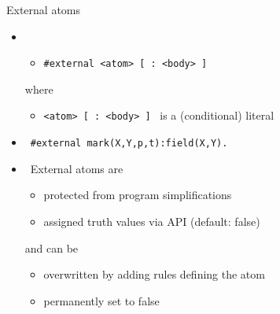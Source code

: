 \begin{frame}{External atoms}
  \begin{itemize}
  \item {}
    \medskip
    \begin{itemize}
    \item [] \texttt{\#external <atom> [ : <body> ]}
    \end{itemize}
    \medskip
    where
    \begin{itemize}
    \item \texttt{<atom> [ : <body> ]} \ is a (conditional) literal
    \end{itemize}
    \bigskip
  \item<2->  \ \texttt{\#external mark(X,Y,p,t)\;:\;field(X,Y).}
    \medskip
  \item <3->  \ External atoms are
    \begin{itemize}
    \item protected from program simplifications
    \item assigned truth values via API (default: false)
    \end{itemize}
    and can be
    \begin{itemize}
    \item overwritten by adding rules defining the atom
    \item permanently set to false
    \end{itemize}
  \end{itemize}
\end{frame}
%
